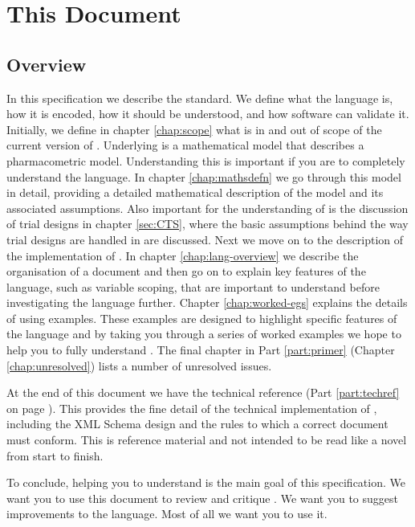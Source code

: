 \chapter{This Document}
\label{chap:this-document}


\section{Overview}

In this specification we describe the \pharmml standard. We define what the language is, how it is encoded,
how it should be understood, and how software can validate it. Initially, we define in chapter \ref{chap:scope}
what is in and out of scope of the current version of \pharmml. Underlying \pharmml is a mathematical model
that describes a pharmacometric model. Understanding this is important if you are to completely understand
the language. In chapter \ref{chap:mathsdefn} we go through this model in detail, providing a detailed
mathematical description of the model and its associated assumptions. Also important for the understanding of
\pharmml is the discussion of trial designs in chapter \ref{sec:CTS}, where the basic assumptions behind
the way trial designs are handled in \pharmml are discussed. Next we move on to
the description of the implementation of \pharmml. In chapter \ref{chap:lang-overview} we describe the
organisation of a \pharmml document and then go on to explain key features of the language, such as variable
scoping, that are important to understand before investigating the language further. Chapter \ref{chap:worked-egs}
explains the details of \pharmml using examples. These examples are designed to highlight specific features of
the language and by taking you through a series of worked examples we hope to help you to fully understand \pharmml.
The final chapter in Part \ref{part:primer} (Chapter \ref{chap:unresolved}) lists a number of unresolved issues.

At the end of this document we have the technical reference (Part \ref{part:techref} on page \pageref{part:techref}).
This provides the fine detail of the technical implementation of \pharmml, including the XML Schema design and
the rules to which a correct \pharmml document must conform. This is reference material and not intended to be
read like a novel  from start to finish.

To conclude, helping you to understand \pharmml is the main goal of this specification. We want you to use this
document to review and critique \pharmml. We want you to suggest improvements to the language. Most of all
we want you to use it.

